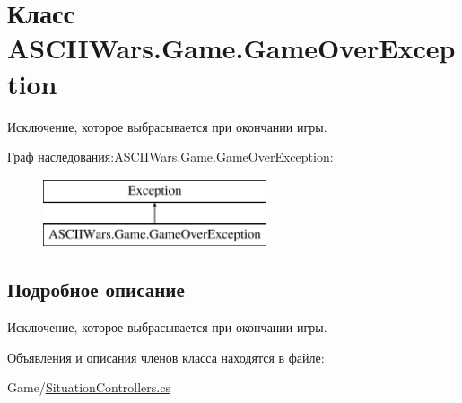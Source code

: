 \hypertarget{class_a_s_c_i_i_wars_1_1_game_1_1_game_over_exception}{}\section{Класс A\+S\+C\+I\+I\+Wars.\+Game.\+Game\+Over\+Exception}
\label{class_a_s_c_i_i_wars_1_1_game_1_1_game_over_exception}


Исключение, которое выбрасывается при окончании игры.  


Граф наследования\+:A\+S\+C\+I\+I\+Wars.\+Game.\+Game\+Over\+Exception\+:\begin{figure}[H]
\begin{center}
\leavevmode
\includegraphics[height=2.000000cm]{class_a_s_c_i_i_wars_1_1_game_1_1_game_over_exception}
\end{center}
\end{figure}


\subsection{Подробное описание}
Исключение, которое выбрасывается при окончании игры. 

Объявления и описания членов класса находятся в файле\+:\begin{DoxyCompactItemize}
\item 
Game/\hyperlink{_situation_controllers_8cs}{Situation\+Controllers.\+cs}\end{DoxyCompactItemize}
